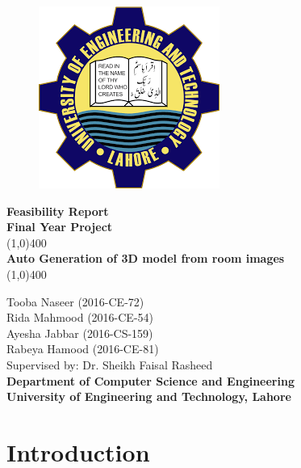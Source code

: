 \documentclass{article}
\begin{document}
\begin{titlepage}
\begin{center}
\vspace*{1cm}
\begin{figure}[h!]
\centering
\includegraphics[scale=0.5]{logo}
\end{figure}
\Large\textbf{Feasibility Report}\\
\Large\textbf{Final Year Project}\\
\vfill
\line(1,0){400}\\[1mm]
\huge{\textbf{Auto Generation of 3D model from room images}}\\[3mm]
\line(1,0){400}\\
\vfill

\large{Tooba Naseer  (2016-CE-72)}\\
\large{Rida Mahmood  (2016-CE-54)}\\
\large{Ayesha Jabbar  (2016-CS-159)}\\
\large{Rabeya Hamood  (2016-CE-81)}\\
\large{Supervised by: Dr. Sheikh Faisal Rasheed}\\
\large{\textbf{Department of Computer Science and Engineering}}\\
\large{\textbf{University of Engineering and Technology, Lahore}}\\
\end{center}
\end{titlepage}
\tableofcontents
\thispagestyle{empty}
\clearpage
\setcounter{page}{1}

\makeatletter
\newcommand{\heading}[1]%
{\par\vskip 1.5ex \@plus .2ex
 \hangindent=1em
 \noindent\makebox[1em][l]{$\,\bullet$}\textbf{\large #1}%
\par\vskip 1.5ex \@plus .2ex
\@afterheading}
\makeatother

\section{Introduction}
\end{document}
